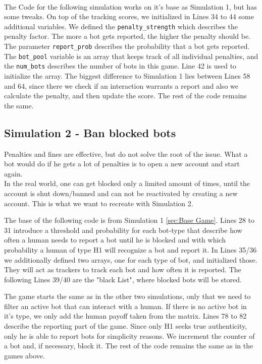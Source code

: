 \documentclass{article}
\begin{document}
\\
The Code for the following simulation works on it's base as Simulation 1, but has some tweaks. On top of the tracking scores, we initialized in Lines 34 to 44 some additional variables. We defined the \texttt{penalty\_strength} which describes the penalty factor. The more a bot gets reported, the higher the penalty should be. 
The parameter \texttt{report\_prob} describes the probability that a bot gets reported. The \texttt{bot\_pool} variable is an array that keeps track of all individual penalties, and the \texttt{num\_bots} describes the number of bots in this game. Line 42 is used to initialize the array. 
The biggest difference to Simulation 1 lies between Lines 58 and 64, since there we check if an interaction warrants a report and also we calculate the penalty, and then update the score. 
The rest of the code remains the same.



\subsection{Simulation 2 - Ban blocked bots}
Penalties and fines are effective, but do not solve the root of the issue. What a bot would do if he gets a lot of penalties is to open a new account and start again. \\
In the real world, one can get blocked only a limited amount of times, until the account is shut down/banned and can not be reactivated by creating a new account.
This is what we want to recreate with Simulation 2. 

The base of the following code is from Simulation 1 \ref{sec:Base Game}. Lines 28 to 31 introduce a threshold and probability for each bot-type that describe how often a human needs to report a bot until he is blocked and with which probability a human of type H1 will recognize a bot and report it. 
In Lines 35/36 we additionally defined two arrays, one for each type of bot, and initialized those. They will act as trackers to track each bot and how often it is reported. The following Lines 39/40 are the "black List", where blocked bots will be stored.

The game starts the same as in the other two simulations, only that we need to filter an active bot that can interact with a human. If there is no active bot in it's type, we only add the human payoff taken from the matrix. 
Lines 78 to 82 describe the reporting part of the game. Since only H1 seeks true authenticity, only he is able to report bots for simplicity reasons. We increment the counter of a bot and, if necessary, block it. 
The rest of the code remains the same as in the games above.
\end{document}
